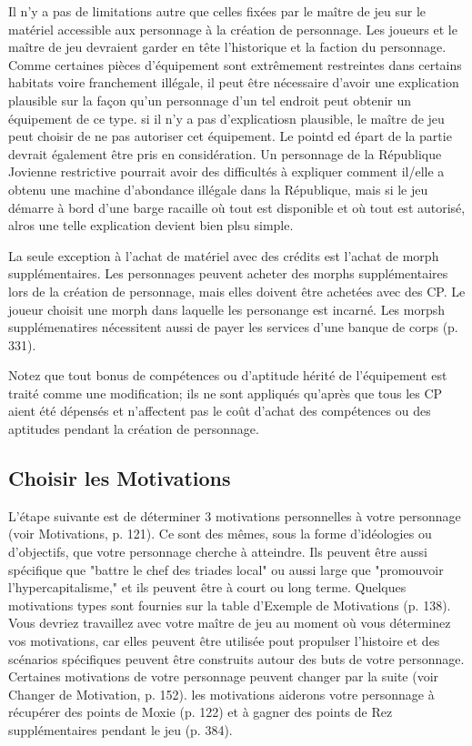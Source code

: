 Il n'y a pas de limitations autre que celles fixées par le maître de jeu sur le matériel accessible aux personnage à la création de personnage. Les joueurs et le maître de jeu devraient garder en tête l'historique et la faction du personnage. Comme certaines pièces d'équipement sont extrêmement restreintes dans certains habitats voire franchement illégale, il peut être nécessaire d'avoir une explication plausible sur la façon qu'un personnage d'un tel endroit peut obtenir un équipement de ce type. si il n'y a pas d'explicatiosn plausible, le maître de jeu peut choisir de ne pas autoriser cet équipement. Le pointd ed épart de la partie devrait également être pris en considération. Un personnage de la République Jovienne restrictive pourrait avoir des difficultés à expliquer comment il/elle a obtenu une machine d'abondance illégale dans la République, mais si le jeu démarre à bord d'une barge racaille où tout est disponible et où tout est autorisé, alros une telle explication devient bien plsu simple. 

La seule exception à l'achat de matériel avec des crédits est l'achat de morph supplémentaires. Les personnages peuvent acheter des morphs supplémentaires lors de la création de personnage, mais elles doivent être achetées avec des CP. Le joueur choisit une morph dans laquelle les personange est incarné. Les morpsh supplémenatires nécessitent aussi de payer les services d'une banque de corps (p. 331). 

Notez que tout bonus de compétences ou d'aptitude hérité de l'équipement est traité comme une modification; ils ne sont appliqués qu'après que tous les CP aient été dépensés et n'affectent pas le coût d'achat des compétences ou des aptitudes pendant la création de personnage. 

\subsection{Choisir les Motivations} \label{sec:choose-motivations} 

L'étape suivante est de déterminer 3 motivations personnelles à votre personnage (voir Motivations, p. 121). Ce sont des mêmes, sous la forme d'idéologies ou d'objectifs, que votre personnage cherche à atteindre. Ils peuvent être aussi spécifique que "battre le chef des triades local" ou aussi large que "promouvoir l'hypercapitalisme," et ils peuvent être à court ou long terme. Quelques motivations types sont fournies sur la table d'Exemple de Motivations (p. 138). Vous devriez travaillez avec votre maître de jeu au moment où vous déterminez vos motivations, car elles peuvent être utilisée pout propulser l'histoire et des scénarios spécifiques peuvent être construits autour des buts de votre personnage. Certaines motivations de votre personnage peuvent changer par la suite (voir Changer de Motivation, p. 152). les motivations aiderons votre personnage à récupérer des points de Moxie (p. 122) et à gagner des points de Rez supplémentaires pendant le jeu (p. 384). 

